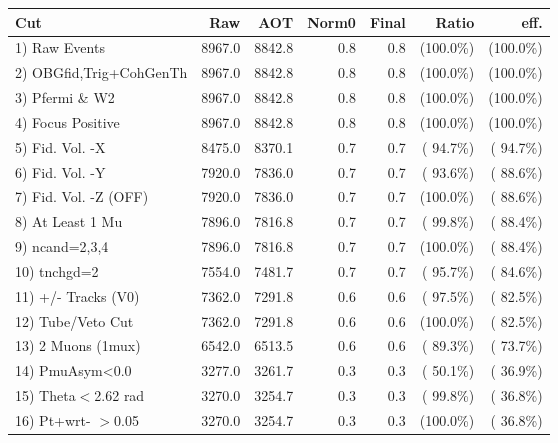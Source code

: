  \begin{table}[h!]\centering
 \begin{tabular}{||l||r|r|r|r|r|r||}
 \hline
 \hline
 Cut & Raw & AOT & Norm0 & Final & Ratio & eff.       \\
 \hline
  1) Raw Events           &       8967.0 &       8842.8 &          0.8 &          0.8 & (100.0\%) & (100.0\%) \\
  2) OBGfid,Trig+CohGenTh &       8967.0 &       8842.8 &          0.8 &          0.8 & (100.0\%) & (100.0\%) \\
  3) Pfermi \& W2         &       8967.0 &       8842.8 &          0.8 &          0.8 & (100.0\%) & (100.0\%) \\
  4) Focus Positive       &       8967.0 &       8842.8 &          0.8 &          0.8 & (100.0\%) & (100.0\%) \\
  5) Fid. Vol. -X         &       8475.0 &       8370.1 &          0.7 &          0.7 & ( 94.7\%) & ( 94.7\%) \\
  6) Fid. Vol. -Y         &       7920.0 &       7836.0 &          0.7 &          0.7 & ( 93.6\%) & ( 88.6\%) \\
  7) Fid. Vol. -Z (OFF)   &       7920.0 &       7836.0 &          0.7 &          0.7 & (100.0\%) & ( 88.6\%) \\
  8) At Least 1 Mu        &       7896.0 &       7816.8 &          0.7 &          0.7 & ( 99.8\%) & ( 88.4\%) \\
  9) ncand=2,3,4          &       7896.0 &       7816.8 &          0.7 &          0.7 & (100.0\%) & ( 88.4\%) \\
 10) tnchgd=2             &       7554.0 &       7481.7 &          0.7 &          0.7 & ( 95.7\%) & ( 84.6\%) \\
 11) +/- Tracks (V0)      &       7362.0 &       7291.8 &          0.6 &          0.6 & ( 97.5\%) & ( 82.5\%) \\
 12) Tube/Veto Cut        &       7362.0 &       7291.8 &          0.6 &          0.6 & (100.0\%) & ( 82.5\%) \\
 13) 2 Muons (1mux)       &       6542.0 &       6513.5 &          0.6 &          0.6 & ( 89.3\%) & ( 73.7\%) \\
 14) PmuAsym<0.0          &       3277.0 &       3261.7 &          0.3 &          0.3 & ( 50.1\%) & ( 36.9\%) \\
 15) Theta$<$2.62 rad     &       3270.0 &       3254.7 &          0.3 &          0.3 & ( 99.8\%) & ( 36.8\%) \\
 16) Pt+wrt- $>$0.05      &       3270.0 &       3254.7 &          0.3 &          0.3 & (100.0\%) & ( 36.8\%) \\

\end{tabular}
\end{table}
